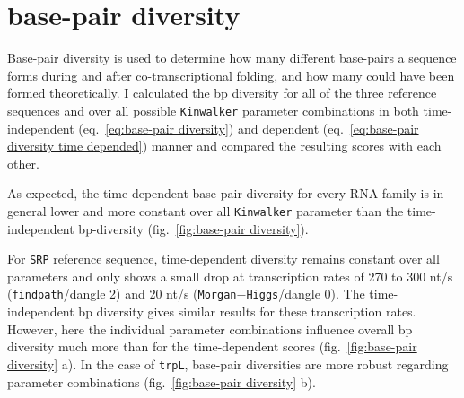\documentclass[ twoside,openright,titlepage,numbers=noenddot,headinclude,%
                footinclude=false, cleardoublepage=empty,abstractoff, %
                BCOR=5mm,paper=a4,fontsize=11pt,%
                ngerman,american,%
                ]{scrreprt}
\begin{document}
\FloatBarrier
		





\FloatBarrier
		

\section{base-pair diversity}
  
Base-pair diversity is used to determine how many different base-pairs a
sequence forms during and after co-transcriptional folding, and how many
could have been formed theoretically.
I calculated the bp diversity for all of the three 
reference sequences and over all possible \texttt{Kinwalker} parameter
combinations in both time-independent (eq.~\ref{eq:base-pair diversity})
and dependent (eq.~\ref{eq:base-pair diversity time depended}) manner
 and compared the resulting scores with each other. 

As expected, the time-dependent base-pair diversity for every RNA family is in general lower and more constant over all \texttt{Kinwalker} parameter than the time-independent bp-diversity (fig.~\ref{fig:base-pair diversity}).

For \texttt{SRP} reference sequence,  time-dependent diversity remains constant over
all parameters and only shows a small drop at transcription rates of 270 to 300
nt/s (\texttt{findpath}/dangle 2) and 20 nt/s (\texttt{Morgan$-$Higgs}/dangle
$0$). The time-independent bp diversity gives similar results for these
transcription rates. However, here the individual parameter combinations
influence overall bp diversity much more than for the time-dependent scores
(fig.~\ref{fig:base-pair diversity} a).
In the case of \texttt{trpL}, base-pair diversities are more robust regarding parameter
combinations (fig.~\ref{fig:base-pair diversity} b).
\end{document}
